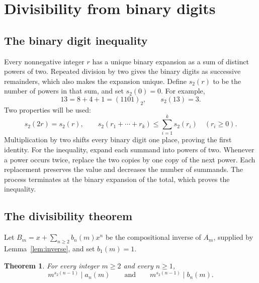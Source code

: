 \documentclass[11pt,a4paper]{article}
\newtheorem{theorem}{Theorem}[section]
\theoremstyle{remark}\newtheorem{remark}[theorem]{Remark}
\begin{document}
\section{Divisibility from binary digits}

\subsection{The binary digit inequality}

Every nonnegative integer $r$ has a unique binary expansion as a sum of
distinct powers of two. Repeated division by two gives the binary digits as
successive remainders, which also makes the expansion unique.
Define $s_2(r)$ to be the number of powers in that
sum, and set $s_2(0)=0$. For example,
\[
 13=8+4+1=(1101)_2,\qquad s_2(13)=3.
\]
Two properties will be used:
\begin{equation}\label{eq:digits}
 s_2(2r)=s_2(r),\qquad
 s_2(r_1+\cdots+r_k)\le\sum_{i=1}^{k}s_2(r_i)
 \quad(r_i\ge0).
\end{equation}
Multiplication by two shifts every binary digit one place, proving the
first identity. For the inequality, expand each summand into powers of
two. Whenever a power occurs twice, replace the two copies by one copy of
the next power. Each replacement preserves the value and decreases the
number of summands. The process terminates at the binary expansion of the
total, which proves the inequality.

\subsection{The divisibility theorem}

Let $B_m=x+\sum_{n\ge2}b_n(m)x^n$ be the compositional inverse of
$A_m$, supplied by Lemma~\ref{lem:inverse}, and set $b_1(m)=1$.

\begin{theorem}\label{thm:binary}
For every integer $m\ge2$ and every $n\ge1$,
\begin{equation}\label{eq:binary}
 m^{s_2(n-1)}\mid a_n(m)
 \qquad\text{and}\qquad
 m^{s_2(n-1)}\mid b_n(m).
\end{equation}
\end{theorem}
\end{document}
